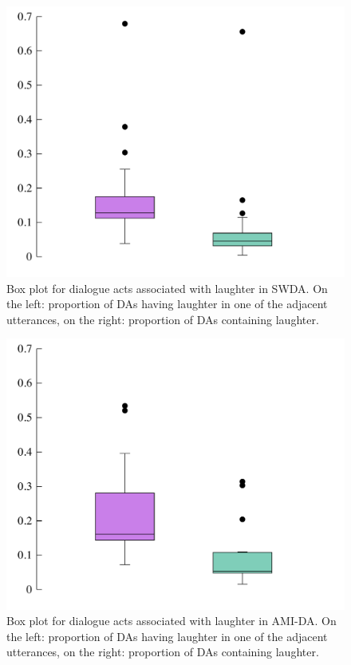 \documentclass[11pt,a4paper]{article}
\begin{document}
\begin{figure}
  \centering
  \includegraphics[width=0.9\linewidth]{img/box-swda.pdf}
  \caption{Box plot for dialogue acts associated with laughter in SWDA. On the left: proportion of DAs having laughter in one of the adjacent utterances, on the right: proportion of DAs containing laughter. }
    \label{fig:box-swda}
\end{figure}

\begin{figure}
  \centering
  \includegraphics[width=0.9\linewidth]{img/box-ami.pdf}
  \caption{Box plot for dialogue acts associated with laughter in AMI-DA. On the left: proportion of DAs having laughter in one of the adjacent utterances, on the right: proportion of DAs containing laughter. }
    \label{fig:box-ami}
\end{figure}
\end{document}
